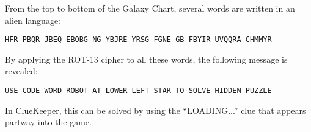 From the top to bottom of the Galaxy Chart, several words are written in an
alien language:

\texttt{HFR PBQR JBEQ EBOBG NG YBJRE YRSG FGNE GB FBYIR UVQQRA CHMMYR}

By applying the ROT-13 cipher to all these words, the following message
is revealed:

\texttt{USE CODE WORD ROBOT AT LOWER LEFT STAR TO SOLVE HIDDEN PUZZLE}

In ClueKeeper, this can be solved by using the ``LOADING...'' clue that
appears partway into the game. 
